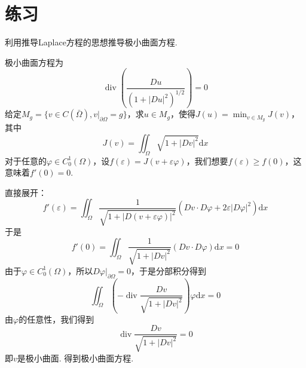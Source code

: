 \documentclass{mynote}
\begin{document}
\section{练习}

\begin{exercise}
    利用推导Laplace方程的思想推导极小曲面方程.
\end{exercise}
极小曲面方程为
\[
    \operatorname{div}\left(\frac{D u}{\left(1+|D u|^2\right)^{1/2}}\right)=0
\]
给定$M_g=\{v\in C(\bar{\Omega}),v|_{\partial \Omega}=g\}$，求$u\in M_g$，使得$J(u)=\min_{v\in M_g}J(v)$，其中
\[
    J(v)=\iint_\Omega \sqrt{1+|Dv|^2}\mathrm{d}x
\]
对于任意的$\varphi\in C_0^1(\Omega)$，设$f(\varepsilon)=J(v+\varepsilon\varphi)$，我们想要$f(\varepsilon)\ge f(0)$，这意味着$f'(0)=0$.

直接展开：
\[
    f'(\varepsilon)=\iint_\Omega \frac{1}{\sqrt{1+|D(v+\varepsilon\varphi)|^2}}(Dv\cdot D\varphi+2\varepsilon |D\varphi|^2)\mathrm{d}x
\]
于是
\[
    f'(0)=\iint_\Omega \frac{1}{\sqrt{1+|Dv|^2}}(Dv\cdot D\varphi)\mathrm{d}x=0
\]
由于$\varphi\in C_0^1(\Omega)$，所以$D\varphi|_{\partial \Omega}=0$，于是分部积分得到
\[
    \iint_\Omega \left(-\operatorname{div}\frac{Dv}{\sqrt{1+|Dv|^2}}\right)\varphi\mathrm{d}x=0
\]
由$\varphi$的任意性，我们得到
\[
    \operatorname{div}\frac{Dv}{\sqrt{1+|Dv|^2}}=0
\]
即$v$是极小曲面. 得到极小曲面方程.
\end{document}
